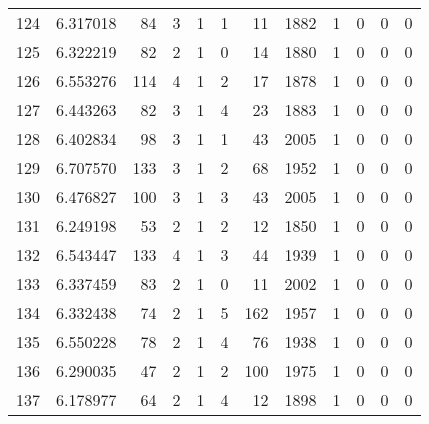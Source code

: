 \begin{tabular}{lrrrrrrrrrrr}
124 &  6.317018 &   84 &      3 &        1 &      1 &              11 &  1882 &               1 &               0 &               0 &               0 \\
125 &  6.322219 &   82 &      2 &        1 &      0 &              14 &  1880 &               1 &               0 &               0 &               0 \\
126 &  6.553276 &  114 &      4 &        1 &      2 &              17 &  1878 &               1 &               0 &               0 &               0 \\
127 &  6.443263 &   82 &      3 &        1 &      4 &              23 &  1883 &               1 &               0 &               0 &               0 \\
128 &  6.402834 &   98 &      3 &        1 &      1 &              43 &  2005 &               1 &               0 &               0 &               0 \\
129 &  6.707570 &  133 &      3 &        1 &      2 &              68 &  1952 &               1 &               0 &               0 &               0 \\
130 &  6.476827 &  100 &      3 &        1 &      3 &              43 &  2005 &               1 &               0 &               0 &               0 \\
131 &  6.249198 &   53 &      2 &        1 &      2 &              12 &  1850 &               1 &               0 &               0 &               0 \\
132 &  6.543447 &  133 &      4 &        1 &      3 &              44 &  1939 &               1 &               0 &               0 &               0 \\
133 &  6.337459 &   83 &      2 &        1 &      0 &              11 &  2002 &               1 &               0 &               0 &               0 \\
134 &  6.332438 &   74 &      2 &        1 &      5 &             162 &  1957 &               1 &               0 &               0 &               0 \\
135 &  6.550228 &   78 &      2 &        1 &      4 &              76 &  1938 &               1 &               0 &               0 &               0 \\
136 &  6.290035 &   47 &      2 &        1 &      2 &             100 &  1975 &               1 &               0 &               0 &               0 \\
137 &  6.178977 &   64 &      2 &        1 &      4 &              12 &  1898 &               1 &               0 &               0 &               0 \\

\end{tabular}
